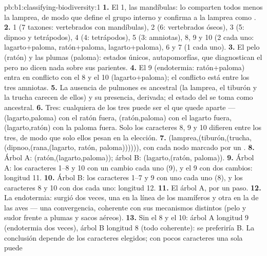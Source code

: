 \begin{solution}{pb:b1:classifying-biodiversity:1}
\textbf{1.} El  1, las mandíbulas: lo comparten todos menos la
lamprea, de modo que define el grupo interno y confirma a la lamprea como
.
\textbf{2.} 1 (7 taxones: vertebrados con mandíbulas), 2 (6: vertebrados
óseos), 3 (5: dipnoo y tetrápodos), 4 (4: tetrápodos), 5 (3: amniotas), 8, 9
y 10 (2 cada uno: lagarto+paloma, ratón+paloma, lagarto+paloma), 6 y 7
(1 cada uno).
\textbf{3.} El pelo (ratón) y las plumas (paloma): estados únicos,
autapomorfías, que diagnostican el  pero no dicen nada sobre sus
parientes.
\textbf{4.} El  9 (endotermia: ratón+paloma) entra en conflicto con
el 8 y el 10 (lagarto+paloma); el conflicto está entre los tres amniotas.
\textbf{5.} La ausencia de pulmones es ancestral (la lamprea, el tiburón y
la trucha carecen de ellos) y su presencia, derivada; el estado del  se toma como ancestral.
\textbf{6.} Tres: cualquiera de los tres puede ser el que quede aparte ---
(lagarto,paloma) con el ratón fuera, (ratón,paloma) con el lagarto fuera,
(lagarto,ratón) con la paloma fuera. Solo los caracteres 8, 9 y 10 difieren
entre los tres, de modo que solo ellos pesan en la elección.
\textbf{7.} (lamprea,(tiburón,(trucha,(dipnoo,(rana,(lagarto, ratón,
paloma)))))), con cada nodo marcado por un .
\textbf{8.} Árbol A: (ratón,(lagarto,paloma)); árbol B: (lagarto,(ratón,
paloma)).
\textbf{9.} Árbol A: los caracteres 1--8 y 10 con un cambio cada uno (9), y
el  9 con dos cambios: longitud \num{11}.
\textbf{10.} Árbol B: los caracteres 1--7 y 9 con uno cada uno (8), y los
caracteres 8 y 10 con dos cada uno: longitud \num{12}.
\textbf{11.} El árbol A, por un paso.
\textbf{12.} La endotermia: surgió dos veces, una en la línea de los
mamíferos y otra en la de las aves --- una convergencia, coherente con sus
mecanismos distintos (pelo y sudor frente a plumas y sacos aéreos).
\textbf{13.} Sin el 8 y el 10: árbol A longitud 9 (endotermia dos veces),
árbol B longitud 8 (todo coherente): se preferiría B. La conclusión depende
de los caracteres elegidos; con pocos caracteres una sola  puede

\end{solution}
